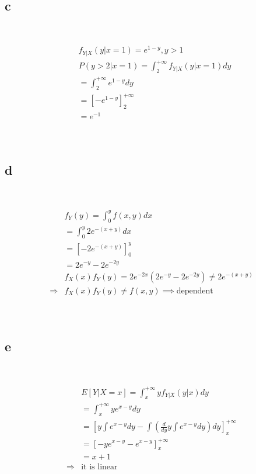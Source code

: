 \documentclass{article}
\begin{document}
~

\subsection*{c}

~

\begin{align*}
    &f_{Y|X}(y|x=1)=e^{1-y},y>1\\
    &P(y>2|x=1)=\int_{2}^{+\infty}f_{Y|X}(y|x=1)dy\\
    &=\int_{2}^{+\infty}e^{1-y}dy\\
    &=\left[-e^{1-y}\right]^{+\infty}_{2}\\
    &=e^{-1}\\
\end{align*}

~

\subsection*{d}

~

\begin{align*}
    &f_Y(y)=\int_{0}^{y}f(x,y)dx\\
    &=\int_{0}^{y}2e^{-(x+y)}dx\\
    &=\left[-2e^{-(x+y)}\right]_{0}^{y}\\
    &=2e^{-y}-2e^{-2y}\\
    &f_X(x)f_Y(y)=2e^{-2x}(2e^{-y}-2e^{-2y})\ne 2e^{-(x+y)}\\
    \Rightarrow&f_X(x)f_Y(y)\ne f(x,y)\implies \text{dependent}\\
\end{align*}

~

\subsection*{e}

~

\begin{align*}
    &E[Y|X=x]=\int_{x}^{+\infty}yf_{Y|X}(y|x)dy\\
    &=\int_{x}^{+\infty}ye^{x-y}dy\\
    &=\left[ y \int e^{x-y}dy-\int(\frac{d}{dy}y\int e^{x-y}dy)dy\right]^{+\infty}_{x}\\
    &=\left[-ye^{x-y}-e^{x-y}\right]^{+\infty}_{x}\\
    &=x+1\\
    \Rightarrow&\text{it is linear}\\
\end{align*}
\end{document}
